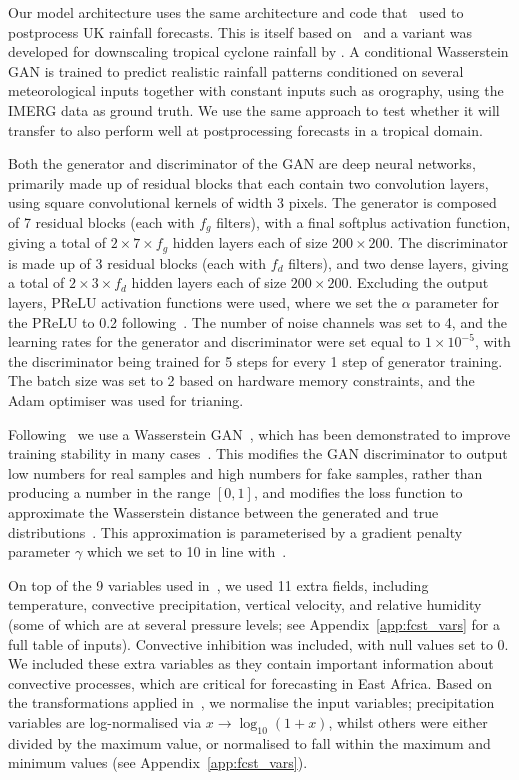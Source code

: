 \documentclass{article}
\begin{document}
Our model architecture uses the same architecture and code that~\cite{harris_generative_2022} used to postprocess UK rainfall forecasts. This is itself based on~\cite{leinonen_stochastic_2020} and a variant was developed for downscaling tropical cyclone rainfall by \cite{vosper_deep_2023}. A conditional Wasserstein GAN is trained to predict realistic rainfall patterns conditioned on several meteorological inputs together with constant inputs such as orography, using the IMERG data as ground truth. We use the same approach to test whether it will transfer to also perform well at postprocessing forecasts in a tropical domain. 

Both the generator and discriminator of the GAN are deep neural networks, primarily made up of residual blocks that each contain two convolution layers, using square convolutional kernels of width 3 pixels. The generator is composed of 7 residual blocks (each with $f_g$ filters), with a final softplus activation function, giving a total of $2 \times 7 \times f_g$ hidden layers each of size $200 \times 200$. The discriminator is made up of 3 residual blocks (each with $f_d$ filters), and two dense layers, giving a total of $2 \times 3 \times f_d$ hidden layers each of size $200 \times 200$. 
Excluding the output layers, PReLU activation functions were used, where we set the $\alpha$ parameter for the PReLU to 0.2 following~\cite{harris_generative_2022}. The number of noise channels was set to 4, and the learning rates for the generator and discriminator were set equal to $1\times 10^{-5}$, with the discriminator being trained for 5 steps for every 1 step of generator training. The batch size was set to 2 based on hardware memory constraints, and the Adam optimiser was used for trianing.

Following~\cite{harris_generative_2022} we use a Wasserstein GAN~\citep{arjovsky_wasserstein_2017}, which has been demonstrated to improve training stability in many cases~\citep{creswell_generative_2018}. This modifies the GAN discriminator to output low numbers for real samples and high numbers for fake samples, rather than producing a number in the range $[0,1]$, and modifies the loss function to approximate the Wasserstein distance between the generated and true distributions~\citep{gulrajani_improved_2017}. This approximation is parameterised by a gradient penalty parameter $\gamma$ which we set to 10 in line with~\cite{gulrajani_improved_2017}.

On top of the 9 variables used in~\cite{harris_generative_2022}, we used 11 extra fields, including temperature, convective precipitation, vertical velocity, and relative humidity (some of which are at several pressure levels; see Appendix~\ref{app:fcst_vars} for a full table of inputs). Convective inhibition was included, with null values set to 0. We included these extra variables as they contain important information about convective processes, which are critical for forecasting in East Africa. Based on the transformations applied in~\cite{harris_generative_2022}, we normalise the input variables; precipitation variables are log-normalised via $x \to \log_{10}(1 + x)$, whilst others were either divided by the maximum value, or normalised to fall within the maximum and minimum values (see Appendix~\ref{app:fcst_vars}).
\end{document}
